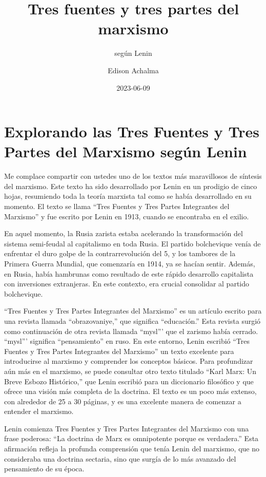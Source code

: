 \documentclass[
  a4paper,
]{article}
\title{Tres fuentes y tres partes del marxismo}
\subtitle{según Lenin}
\author{Edison Achalma}
\date{2023-06-09}
\begin{document}
\maketitle

\section{Explorando las Tres Fuentes y Tres Partes del Marxismo según
Lenin}\label{explorando-las-tres-fuentes-y-tres-partes-del-marxismo-seguxfan-lenin}

Me complace compartir con ustedes uno de los textos más maravillosos de
síntesis del marxismo. Este texto ha sido desarrollado por Lenin en un
prodigio de cinco hojas, resumiendo toda la teoría marxista tal como se
había desarrollado en su momento. El texto se llama ``Tres Fuentes y
Tres Partes Integrantes del Marxismo'' y fue escrito por Lenin en 1913,
cuando se encontraba en el exilio.

En aquel momento, la Rusia zarista estaba acelerando la transformación
del sistema semi-feudal al capitalismo en toda Rusia. El partido
bolchevique venía de enfrentar el duro golpe de la contrarrevolución del
5, y los tambores de la Primera Guerra Mundial, que comenzaría en 1914,
ya se hacían sentir. Además, en Rusia, había hambrunas como resultado de
este rápido desarrollo capitalista con inversiones extranjeras. En este
contexto, era crucial consolidar al partido bolchevique.

``Tres Fuentes y Tres Partes Integrantes del Marxismo'' es un artículo
escrito para una revista llamada ``obrazovaniye,'' que significa
``educación.'' Esta revista surgió como continuación de otra revista
llamada ``mysl''' que el zarismo había cerrado. ``mysl''' significa
``pensamiento'' en ruso. En este entorno, Lenin escribió ``Tres Fuentes
y Tres Partes Integrantes del Marxismo'' un texto excelente para
introducirse al marxismo y comprender los conceptos básicos. Para
profundizar aún más en el marxismo, se puede consultar otro texto
titulado ``Karl Marx: Un Breve Esbozo Histórico,'' que Lenin escribió
para un diccionario filosófico y que ofrece una visión más completa de
la doctrina. El texto es un poco más extenso, con alrededor de 25 a 30
páginas, y es una excelente manera de comenzar a entender el marxismo.

Lenin comienza Tres Fuentes y Tres Partes Integrantes del Marxismo con
una frase poderosa: ``La doctrina de Marx es omnipotente porque es
verdadera.'' Esta afirmación refleja la profunda comprensión que tenía
Lenin del marxismo, que no consideraba una doctrina sectaria, sino que
surgía de lo más avanzado del pensamiento de su época.
\end{document}

